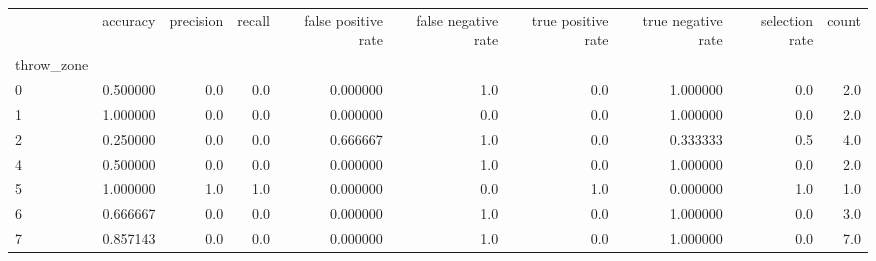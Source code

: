 \begin{tabular}{lrrrrrrrrr}
\toprule
{} &  accuracy &  precision &  recall &  false positive rate &  false negative rate &  true positive rate &  true negative rate &  selection rate &  count \\
throw\_zone &           &            &         &                      &                      &                     &                     &                 &        \\
\midrule
0          &  0.500000 &        0.0 &     0.0 &             0.000000 &                  1.0 &                 0.0 &            1.000000 &             0.0 &    2.0 \\
1          &  1.000000 &        0.0 &     0.0 &             0.000000 &                  0.0 &                 0.0 &            1.000000 &             0.0 &    2.0 \\
2          &  0.250000 &        0.0 &     0.0 &             0.666667 &                  1.0 &                 0.0 &            0.333333 &             0.5 &    4.0 \\
4          &  0.500000 &        0.0 &     0.0 &             0.000000 &                  1.0 &                 0.0 &            1.000000 &             0.0 &    2.0 \\
5          &  1.000000 &        1.0 &     1.0 &             0.000000 &                  0.0 &                 1.0 &            0.000000 &             1.0 &    1.0 \\
6          &  0.666667 &        0.0 &     0.0 &             0.000000 &                  1.0 &                 0.0 &            1.000000 &             0.0 &    3.0 \\
7          &  0.857143 &        0.0 &     0.0 &             0.000000 &                  1.0 &                 0.0 &            1.000000 &             0.0 &    7.0 \\
\bottomrule
\end{tabular}
